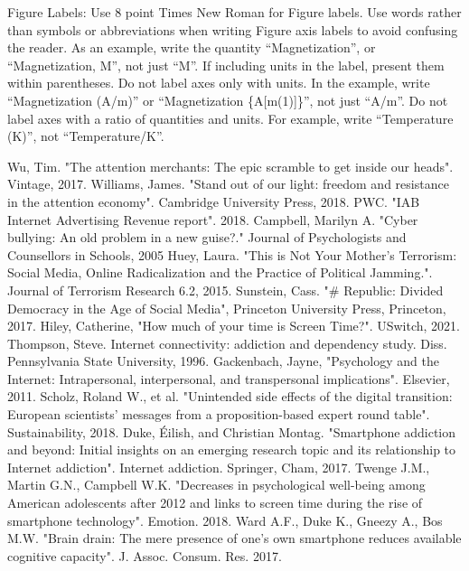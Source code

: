 \documentclass[conference]{IEEEtran}
\begin{document}
Figure Labels: Use 8 point Times New Roman for Figure labels. Use words 
rather than symbols or abbreviations when writing Figure axis labels to 
avoid confusing the reader. As an example, write the quantity 
``Magnetization'', or ``Magnetization, M'', not just ``M''. If including 
units in the label, present them within parentheses. Do not label axes only 
with units. In the example, write ``Magnetization (A/m)'' or ``Magnetization 
\{A[m(1)]\}'', not just ``A/m''. Do not label axes with a ratio of 
quantities and units. For example, write ``Temperature (K)'', not 
``Temperature/K''.


\begin{thebibliography}{00}

 Wu, Tim. "The attention merchants: The epic scramble to get inside our heads". Vintage, 2017.
 Williams, James. "Stand out of our light: freedom and resistance in the attention economy". Cambridge University Press, 2018.
 PWC. "IAB Internet Advertising Revenue report". 2018.
 Campbell, Marilyn A. "Cyber bullying: An old problem in a new guise?." Journal of Psychologists and Counsellors in Schools, 2005
 Huey, Laura. "This is Not Your Mother's Terrorism: Social Media, Online Radicalization and the Practice of Political Jamming.". Journal of Terrorism Research 6.2, 2015.
 Sunstein, Cass. "\# Republic: Divided Democracy in the Age of Social Media", Princeton University Press, Princeton, 2017.
 Hiley, Catherine, "How much of your time is Screen Time?". USwitch, 2021.
 Thompson, Steve. Internet connectivity: addiction and dependency study. Diss. Pennsylvania State University, 1996.
 Gackenbach, Jayne, "Psychology and the Internet: Intrapersonal, interpersonal, and transpersonal implications". Elsevier, 2011.
 Scholz, Roland W., et al. "Unintended side effects of the digital transition: European scientists’ messages from a proposition-based expert round table". Sustainability, 2018.
 Duke, Éilish, and Christian Montag. "Smartphone addiction and beyond: Initial insights on an emerging research topic and its relationship to Internet addiction". Internet addiction. Springer, Cham, 2017.
 Twenge J.M., Martin G.N., Campbell W.K. "Decreases in psychological well-being among American adolescents after 2012 and links to screen time during the rise of smartphone technology". Emotion. 2018.
 Ward A.F., Duke K., Gneezy A., Bos M.W. "Brain drain: The mere presence of one’s own smartphone reduces available cognitive capacity". J. Assoc. Consum. Res. 2017.

\end{thebibliography}
\end{document}
